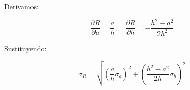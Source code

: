 \documentclass[article,12pt]{elsarticle}
\begin{document}
Derivamos:

\begin{mdframed}
\begin{equation}
    \frac{\partial R}{\partial a} = \frac{a}{h}, \quad \frac{\partial R}{\partial h} = -\frac{h^2-a^2}{2h^2}
\end{equation}
\end{mdframed}

Sustituyendo:

\begin{mdframed}
\begin{equation}
    \sigma_R = \sqrt{\left(\frac{a}{h}\sigma_{a}\right)^2 + \left(\frac{h^2-a^2}{2h} \sigma_{h}\right)^2}
\end{equation}
\end{mdframed}
\end{document}
